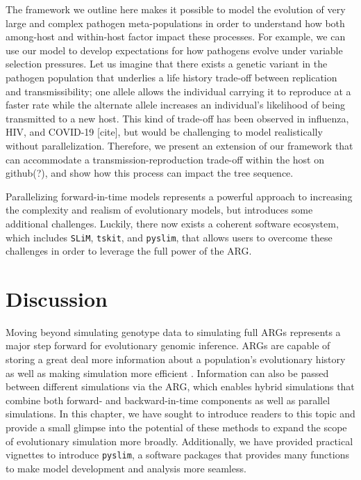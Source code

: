\documentclass[12pt]{article}
\newcommand{\tskit}[0]{\texttt{tskit}\xspace}
\newcommand{\slim}[0]{\texttt{SLiM}\xspace}
\newcommand{\pyslim}[0]{\texttt{pyslim}\xspace}
\begin{document}

The framework we outline here makes it possible to model the evolution of very large and complex pathogen meta-populations in order to understand how both among-host
and within-host factor impact these processes. For example, we can use our model to develop expectations for how pathogens evolve under variable selection pressures. Let
us imagine that there exists a genetic variant in the pathogen population that underlies a life history trade-off between replication and transmissibility; one allele allows the
individual carrying it to reproduce at a faster rate while the alternate allele increases an individual's likelihood of being transmitted to a new host. This kind of trade-off has been
observed in influenza, HIV, and COVID-19 [cite], but would be challenging to model realistically without parallelization. Therefore, we present an extension of our framework
that can accommodate a transmission-reproduction trade-off within the host on github(?), and show how this process can impact the tree sequence.

Parallelizing forward-in-time models represents a powerful approach to increasing the complexity and realism of evolutionary models, but introduces some additional challenges.
Luckily, there now exists a coherent software ecosystem, which includes \slim, \tskit, and \pyslim, that allows users to overcome these challenges in order to leverage the full
power of the ARG.

\section*{Discussion}

Moving beyond simulating genotype data to simulating full ARGs represents a major step forward for evolutionary genomic inference. ARGs are capable of storing a great
deal more information about a population's evolutionary history as well as making simulation more efficient \citep{kelleher2016efficient}. Information can also be passed
between different simulations via the ARG, which enables hybrid simulations that combine both forward- and backward-in-time components as well as parallel simulations.
In this chapter, we have sought to introduce readers to this topic and provide a small glimpse into the potential of these methods to expand the scope of evolutionary simulation
more broadly. Additionally, we have provided practical vignettes to introduce \pyslim, a software packages that provides many functions to make model development and
analysis more seamless.
\end{document}
